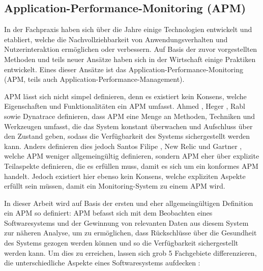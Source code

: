 

\subsection{Application-Performance-Monitoring (APM)}

In der Fachpraxis haben sich über die Jahre einige Technologien entwickelt und etabliert, welche die Nachvollziehbarkeit von Anwendungsverhalten und Nutzerinteraktion ermöglichen oder verbessern. Auf Basis der zuvor vorgestellten Methoden und teils neuer Ansätze haben sich in der Wirtschaft einige Praktiken entwickelt. Eines dieser Ansätze ist das Application-Performance-Monitoring (APM, teils auch Application-Performance-Management).

APM lässt sich nicht simpel definieren, denn es existiert kein Konsens, welche Eigenschaften und Funktionalitäten ein APM umfasst. Ahmed \etal \cite{StudyingTheEffectivenessOfAPMTools}, Heger \etal \cite{APMStateOfTheArtAndChallenges}, Rabl \etal \cite{SolvingBigDataChallengesForAPM} sowie Dynatrace \cite{DynatraceAPM} definieren, dass APM eine Menge an Methoden, Techniken und Werkzeugen umfasst, die das System konstant überwachen und Aufschluss über den Zustand geben, sodass die Verfügbarkeit des Systems sichergestellt werden kann. Anders definieren dies jedoch Santos Filipe \cite{ClientSideMonitoringOfDistributedSystems}, New Relic \cite{NewRelicAPM} und Gartner \cite{GartnerMagicQuadrantForAPM}, welche APM weniger allgemeingültig definieren, sondern APM eher über explizite Teilaspekte definieren, die es erfüllen muss, damit es sich um ein konformes APM handelt. Jedoch existiert hier ebenso kein Konsens, welche expliziten Aspekte erfüllt sein müssen, damit ein Monitoring-System zu einem APM wird.

In dieser Arbeit wird auf Basis der ersten und eher allgemeingültigen Definition ein APM so definiert: APM befasst sich mit dem Beobachten eines Softwaresystems und der Gewinnung von relevanten Daten aus diesem System zur näheren Analyse, um zu ermöglichen, dass Rückschlüsse über die Gesundheit des Systems gezogen werden können und so die Verfügbarkeit sichergestellt werden kann. Um dies zu erreichen, lassen sich grob 5 Fachgebiete differenzieren, die unterschiedliche Aspekte eines Softwaresystems aufdecken \cite{ASurveyOfCloudMonitoringTools} \cite{GartnerMagicQuadrantForAPM} \cite{ResearchAndApplicationOfOperatingMonitoring}:


